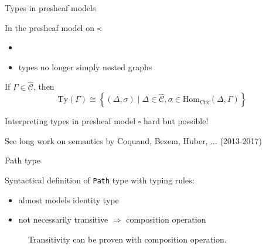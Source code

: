\documentclass[english]{beamer}
\newcommand{\op}[1]{\mathtt{#1}}
\newcommand{\pa}[3]{\op{Path}_{#1}\left(#2, #3\right)}
\begin{document}
\begin{frame}{Types in presheaf models}

In the presheaf model on $\square$:
\begin{itemize}
    \item 
    \item types no longer simply nested graphs
\end{itemize}


\begin{lemma}

If $\Gamma \in \widehat{\mathcal{C}}$, then 
$$\text{Ty}(\Gamma) \cong \left\{ (\Delta, \sigma) \mid \Delta \in \widehat{\mathcal{C}}, \sigma \in \text{Hom}_{\text{Ctx}}(\Delta , \Gamma) \right\}$$
\end{lemma}

\pause


Interpreting types in presheaf model $\square$ hard but possible! 

See long work on semantics by Coquand, Bezem, Huber, ... (2013-2017) 


\end{frame}

\begin{frame}{Path type}
 
 Syntactical definition of \texttt{Path} type with typing rules:

\begin{prooftree}

\end{prooftree}

% 

\begin{itemize}
 \item almost models identity type
 \item not necessarily transitive $\Rightarrow$ composition operation
\end{itemize}


\begin{figure}
\centering

\caption{Transitivity can be proven with composition operation.}
\end{figure}

\end{frame}
\end{document}

